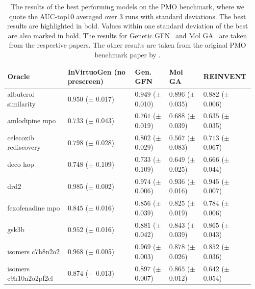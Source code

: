 \documentclass{article} %
\begin{document}
\begin{table}[ht]
\centering
\caption{The results of the best performing models on the PMO benchmark, where we quote the AUC-top10 averaged over 3 runs with standard deviations. The best results are highlighted in bold. Values within one standard deviation of the best are also marked in bold. The results for Genetic GFN~\citep{kim2024geneticguidedgflownetssampleefficient} and Mol GA~\citep{tripp2023geneticalgorithmsstrongbaselines} are taken from the respective papers. The other results are taken from the original PMO benchmark paper by \citep{gao2022sampleefficiencymattersbenchmark}.}
\label{tab:no_prescreen}
\begin{tabularx}{\linewidth}{l|>{}p{2.2cm} Y Y Y }
\toprule
Oracle & InVirtuoGen (no prescreen) & Gen. GFN & Mol GA & REINVENT \\
\midrule
\small{albuterol similarity} & $\mathbf{0.950}$ {\tiny ($\pm$ 0.017)} & $\mathbf{0.949}$ {\tiny ($\pm$ 0.010)} & $0.896$ {\tiny ($\pm$ 0.035)} & $0.882$ {\tiny ($\pm$ 0.006)} \\
\small{amlodipine mpo} & $0.733$ {\tiny ($\pm$ 0.043)} & $\mathbf{0.761}$ {\tiny ($\pm$ 0.019)} & $0.688$ {\tiny ($\pm$ 0.039)} & $0.635$ {\tiny ($\pm$ 0.035)} \\
\small{celecoxib rediscovery} & $\mathbf{0.798}$ {\tiny ($\pm$ 0.028)} & $\mathbf{0.802}$ {\tiny ($\pm$ 0.029)} & $0.567$ {\tiny ($\pm$ 0.083)} & $0.713$ {\tiny ($\pm$ 0.067)} \\
\small{deco hop} & $\mathbf{0.748}$ {\tiny ($\pm$ 0.109)} & $\mathbf{0.733}$ {\tiny ($\pm$ 0.109)} & $\mathbf{0.649}$ {\tiny ($\pm$ 0.025)} & $\mathbf{0.666}$ {\tiny ($\pm$ 0.044)} \\
\small{drd2} & $\mathbf{0.985}$ {\tiny ($\pm$ 0.002)} & $0.974$ {\tiny ($\pm$ 0.006)} & $0.936$ {\tiny ($\pm$ 0.016)} & $0.945$ {\tiny ($\pm$ 0.007)} \\
\small{fexofenadine mpo} & $\mathbf{0.845}$ {\tiny ($\pm$ 0.016)} & $\mathbf{0.856}$ {\tiny ($\pm$ 0.039)} & $\mathbf{0.825}$ {\tiny ($\pm$ 0.019)} & $0.784$ {\tiny ($\pm$ 0.006)} \\
\small{gsk3b} & $\mathbf{0.952}$ {\tiny ($\pm$ 0.016)} & $0.881$ {\tiny ($\pm$ 0.042)} & $0.843$ {\tiny ($\pm$ 0.039)} & $0.865$ {\tiny ($\pm$ 0.043)} \\
\small{isomers c7h8n2o2} & $\mathbf{0.968}$ {\tiny ($\pm$ 0.005)} & $\mathbf{0.969}$ {\tiny ($\pm$ 0.003)} & $0.878$ {\tiny ($\pm$ 0.026)} & $0.852$ {\tiny ($\pm$ 0.036)} \\
\small{isomers c9h10n2o2pf2cl} & $0.874$ {\tiny ($\pm$ 0.013)} & $\mathbf{0.897}$ {\tiny ($\pm$ 0.007)} & $0.865$ {\tiny ($\pm$ 0.012)} & $0.642$ {\tiny ($\pm$ 0.054)} \\

\end{tabularx}
\end{table}
\end{document}
